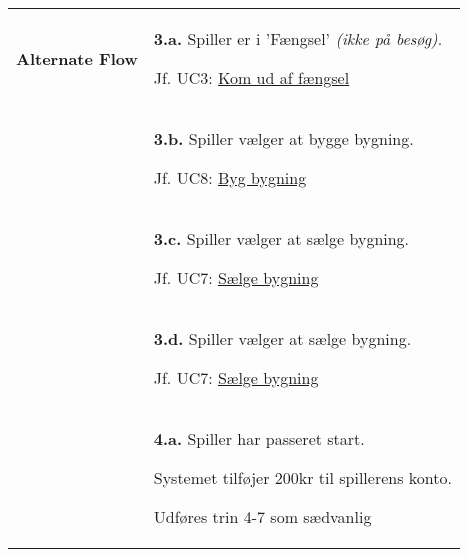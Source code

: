 \documentclass[class=article, crop=false]{standalone}
\begin{document}
\begin{table}[H]
\begin{tabularx}{\textwidth}{|l|X|}
                    \textbf{Alternate Flow}   & \textbf{3.a.} Spiller er i 'Fængsel' \textit{(ikke på besøg)}.
                    \begin{enumerate} \begin{tabenum}
                                          \item Jf. UC3: \underline{Kom ud af fængsel}
                    \end{tabenum} \end{enumerate}
                    \\


                                      & \textbf{3.b.} Spiller vælger at bygge bygning.
            \begin{enumerate} \begin{tabenum}
                                  \item Jf. UC8: \underline{Byg bygning}
            \end{tabenum} \end{enumerate}
            \\

                                    & \textbf{3.c.} Spiller vælger at sælge bygning.
                                    \begin{enumerate} \begin{tabenum}
                                                          \item Jf. UC7: \underline{Sælge bygning}
                                    \end{tabenum} \end{enumerate}
                                    \\

                            & \textbf{3.d.} Spiller vælger at sælge bygning.
                            \begin{enumerate} \begin{tabenum}
                                                  \item Jf. UC7: \underline{Sælge bygning}
                            \end{tabenum} \end{enumerate}
                            \\


                              & \textbf{4.a.} Spiller har passeret start.
                                \begin{enumerate} \begin{tabenum}
                                        \item Systemet tilføjer 200kr til spillerens konto.
                                        \item Udføres trin 4-7 som sædvanlig
                                    \end{tabenum} \end{enumerate}
                                 \\



\end{tabularx}
\end{table}
\end{document}
